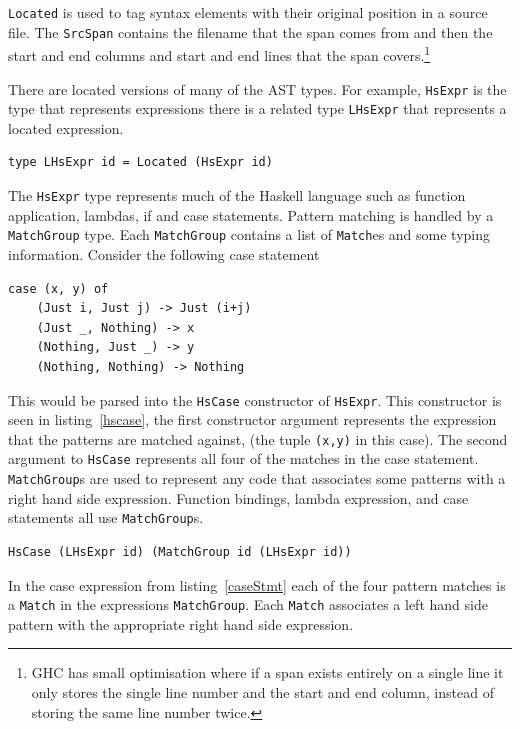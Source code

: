 \texttt{Located} is used to tag syntax elements with their original position in a source file. The \texttt{SrcSpan} contains the filename that the span comes from and then the start and end columns and start and end lines that the span covers.\footnote{GHC has small optimisation where if a span exists entirely on a single line it only stores the single line number and the start and end column, instead of storing the same line number twice.} 

There are located versions of many of the AST types. For example, \texttt{HsExpr} is the type that represents expressions there is a related type \texttt{LHsExpr} that represents a located expression.

\begin{lstlisting}[caption={The located expression}]
type LHsExpr id = Located (HsExpr id)
\end{lstlisting}

The \texttt{HsExpr} type represents much of the Haskell language such as function application, lambdas, if and case statements. Pattern matching is handled by a \texttt{MatchGroup} type. Each \texttt{MatchGroup} contains a list of \texttt{Match}es and some typing information. Consider the following case statement

\begin{lstlisting}[caption={A case statement}, label=caseStmt]
case (x, y) of
	(Just i, Just j) -> Just (i+j)	
	(Just _, Nothing) -> x
	(Nothing, Just _) -> y
	(Nothing, Nothing) -> Nothing
\end{lstlisting}

This would be parsed into the \texttt{HsCase} constructor of \texttt{HsExpr}. This constructor is seen in listing~\ref{hscase}, the first constructor argument represents the expression that the patterns are matched against, (the tuple \texttt{(x,y)} in this case). The second argument to \texttt{HsCase} represents all four of the matches in the case statement. \texttt{MatchGroup}s are used to represent any code that associates some patterns with a right hand side expression. Function bindings, lambda expression, and case statements all use \texttt{MatchGroup}s. 

\begin{lstlisting}[caption={The \texttt{HsCase} constructor}, label=hscase]
HsCase (LHsExpr id) (MatchGroup id (LHsExpr id))	
\end{lstlisting}

In the case expression from listing~\ref{caseStmt} each of the four pattern matches is a \texttt{Match} in the expressions \texttt{MatchGroup}. Each \texttt{Match} associates a left hand side pattern with the appropriate right hand side expression.

